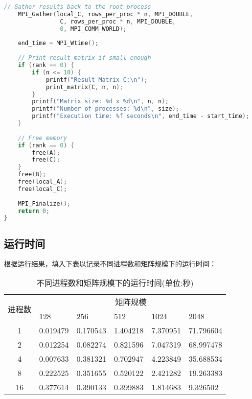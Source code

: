 \documentclass{SYSUReport}
\begin{document}
\begin{lstlisting}[language=C]
    // Gather results back to the root process
    MPI_Gather(local_C, rows_per_proc * n, MPI_DOUBLE,
                C, rows_per_proc * n, MPI_DOUBLE,
                0, MPI_COMM_WORLD);
        
    end_time = MPI_Wtime();
        
    // Print result matrix if small enough
    if (rank == 0) {
        if (n <= 10) {
            printf("Result Matrix C:\n");
            print_matrix(C, n, n);
        }
        printf("Matrix size: %d x %d\n", n, n);
        printf("Number of processes: %d\n", size);
        printf("Execution time: %f seconds\n", end_time - start_time);
    }
        
    // Free memory
    if (rank == 0) {
        free(A);
        free(C);
    }
    free(B);
    free(local_A);
    free(local_C);
        
    MPI_Finalize();
    return 0;
}
\end{lstlisting}

\subsection{运行时间}
根据运行结果，填入下表以记录不同进程数和矩阵规模下的运行时间：
\begin{table}[H]
\centering
\begin{tabular}{|c|lllll|}
\hline
\multirow{2}{*}{进程数} & \multicolumn{5}{c|}{矩阵规模}                                                                        \\ \cline{2-6} 
 & \multicolumn{1}{l|}{128} & \multicolumn{1}{l|}{256} & \multicolumn{1}{l|}{512} & \multicolumn{1}{l|}{1024} & 2048 \\ \hline
1                    & \multicolumn{1}{l|}{0.019479} & \multicolumn{1}{l|}{0.170543} & \multicolumn{1}{l|}{1.404218} & \multicolumn{1}{l|}{7.370951} & 71.796604 \\ \hline
2                    & \multicolumn{1}{l|}{0.012254} & \multicolumn{1}{l|}{0.082274} & \multicolumn{1}{l|}{0.821596} & \multicolumn{1}{l|}{7.047319} & 68.997478 \\ \hline
4                    & \multicolumn{1}{l|}{0.007633} & \multicolumn{1}{l|}{0.381321} & \multicolumn{1}{l|}{0.702947} & \multicolumn{1}{l|}{4.223849} & 35.688534 \\ \hline
8                    & \multicolumn{1}{l|}{0.222525} & \multicolumn{1}{l|}{0.351655} & \multicolumn{1}{l|}{0.520122} & \multicolumn{1}{l|}{2.421282} & 19.263383 \\ \hline
16                   & \multicolumn{1}{l|}{0.377614} & \multicolumn{1}{l|}{0.390133} & \multicolumn{1}{l|}{0.399883} & \multicolumn{1}{l|}{1.814683} & 9.326502 \\ \hline
\end{tabular}
\caption{不同进程数和矩阵规模下的运行时间(单位:秒)}
\end{table}
\end{document}

